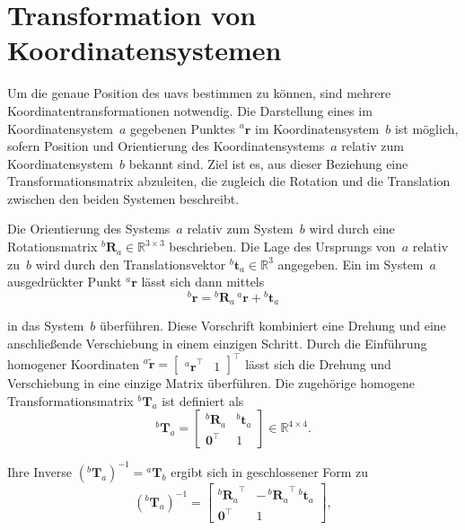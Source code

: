 \section{Transformation von Koordinatensystemen}
Um die genaue Position des \gls{uav}s bestimmen zu können, sind mehrere Koordinatentransformationen notwendig.
Die Darstellung eines im Koordinatensystem~$a$ gegebenen Punktes $^a\mathbf{r}$ im Koordinatensystem~$b$ ist möglich, sofern Position und Orientierung des 
Koordinatensystems~$a$ relativ zum Koordinatensystem~$b$ bekannt sind.
Ziel ist es, aus dieser Beziehung eine Transformationsmatrix abzuleiten, die zugleich die Rotation und die Translation zwischen den beiden Systemen beschreibt.~\cite{2016}

Die Orientierung des Systems~$a$ relativ zum System~$b$ wird durch eine Rotationsmatrix $^b\mathbf{R}_a \in \mathbb{R}^{3 \times 3}$ beschrieben.
Die Lage des Ursprungs von~$a$ relativ zu~$b$ wird durch den Translationsvektor $^b\mathbf{t}_a \in \mathbb{R}^{3}$ angegeben.
Ein im System~$a$ ausgedrückter Punkt $^a\mathbf{r}$ lässt sich dann mittels
\begin{equation}
^b\mathbf{r} = {^b\mathbf{R}_a}\,{^a\mathbf{r}} + {^b\mathbf{t}_a}
\label{eq:trafo_punkt}
\end{equation}

in das System~$b$ überführen.
Diese Vorschrift kombiniert eine Drehung und eine anschließende Verschiebung in einem einzigen Schritt.
Durch die Einführung homogener Koordinaten
$^a\tilde{\mathbf{r}} = \begin{bmatrix} {^a\mathbf{r}}^\top & 1 \end{bmatrix}^\top$
lässt sich die Drehung und Verschiebung in eine einzige Matrix überführen.
Die zugehörige homogene Transformationsmatrix $^b\mathbf{T}_a$ ist definiert als
\begin{equation}
^b\mathbf{T}_a =
\begin{bmatrix}
^b\mathbf{R}_a & ^b\mathbf{t}_a \\
\mathbf{0}^{\top} & 1
\end{bmatrix}
\in \mathbb{R}^{4 \times 4}.
\label{eq:trafo_matrix}
\end{equation}

Ihre Inverse $\left(^b\mathbf{T}_a\right)^{-1} = {^a\mathbf{T}_b}$ ergibt sich in geschlossener Form zu
\begin{equation}
\left(^b\mathbf{T}_a\right)^{-1} =
\begin{bmatrix}
{^b\mathbf{R}_a}^{\top} & -\,{^b\mathbf{R}_a}^{\top}\,{^b\mathbf{t}_a} \\
\mathbf{0}^{\top} & 1
\end{bmatrix},
\label{eq:trafo_inverse}
\end{equation}

